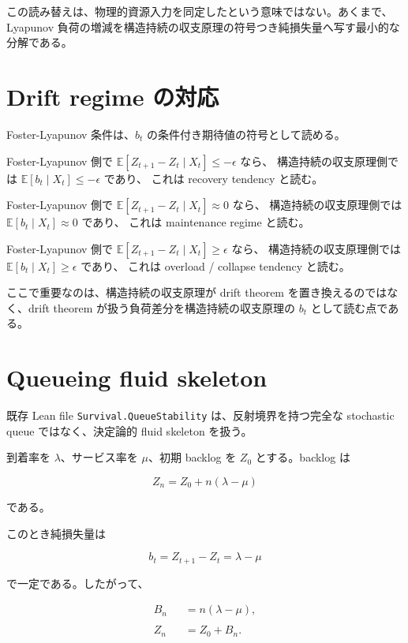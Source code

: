 \documentclass[12pt,a4paper]{article}
\begin{document}
この読み替えは、物理的資源入力を同定したという意味ではない。あくまで、Lyapunov 負荷の増減を構造持続の収支原理の符号つき純損失量へ写す最小的な分解である。

\section{Drift regime の対応}\label{drift-regime-ux306eux5bfeux5fdc}

Foster-Lyapunov 条件は、\(b_{t}\) の条件付き期待値の符号として読める。

Foster-Lyapunov 側で \(\mathbb E[Z_{t+1}-Z_{t}\mid X_{t}]\le -\epsilon\) なら、 構造持続の収支原理側では \(\mathbb E[b_{t}\mid X_{t}]\le -\epsilon\) であり、 これは recovery tendency と読む。

Foster-Lyapunov 側で \(\mathbb E[Z_{t+1}-Z_{t}\mid X_{t}]\approx 0\) なら、 構造持続の収支原理側では \(\mathbb E[b_{t}\mid X_{t}]\approx 0\) であり、 これは maintenance regime と読む。

Foster-Lyapunov 側で \(\mathbb E[Z_{t+1}-Z_{t}\mid X_{t}]\ge \epsilon\) なら、 構造持続の収支原理側では \(\mathbb E[b_{t}\mid X_{t}]\ge \epsilon\) であり、 これは overload / collapse tendency と読む。

ここで重要なのは、構造持続の収支原理が drift theorem を置き換えるのではなく、drift theorem が扱う負荷差分を構造持続の収支原理の \(b_{t}\) として読む点である。

\section{Queueing fluid skeleton}\label{queueing-fluid-skeleton}

既存 Lean file \texttt{Survival.QueueStability} は、反射境界を持つ完全な stochastic queue ではなく、決定論的 fluid skeleton を扱う。

到着率を \(\lambda\)、サービス率を \(\mu\)、初期 backlog を \(Z_0\) とする。backlog は

\[
Z_{n}=Z_0+n(\lambda-\mu)
\]

である。

このとき純損失量は

\[
b_{t}=Z_{t+1}-Z_{t}=\lambda-\mu
\]

で一定である。したがって、

\[
\begin{aligned}
B_{n}&=n(\lambda-\mu), \\
\qquad \\
Z_{n}&=Z_0+B_{n}.
\end{aligned}
\]
\end{document}
